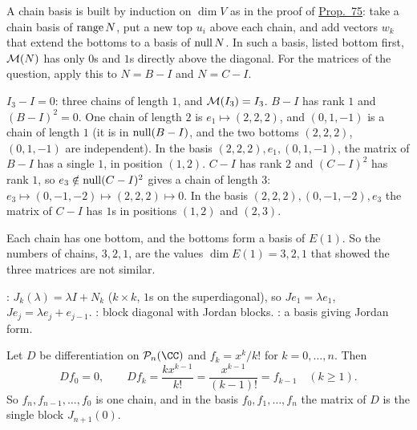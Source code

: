 \documentclass[10pt]{scrartcl}
\begin{document}
\revisit A chain basis is built by induction on $\dim V$ as in the proof of \hyperref[prop-75]{Prop.~75}: take a chain basis of $\operatorname{range} N$, put a new top $u_i$ above each chain, and add vectors $w_k$ that extend the bottoms to a basis of $\operatorname{null} N$. In such a basis, listed bottom first, $\mathcal M(N)$ has only $0$s and $1$s directly above the diagonal. For the matrices of the question, apply this to $N=B-I$ and $N=C-I$.
\begin{itemize}
  \ii $I_3-I=0$: three chains of length $1$, and $\mathcal M(I_3)=I_3$.
  \ii $B-I$ has rank $1$ and $(B-I)^2=0$. One chain of length $2$ is $e_1\mapsto(2,2,2)$, and $(0,1,-1)$ is a chain of length $1$ (it is in $\operatorname{null}(B-I)$, and the two bottoms $(2,2,2)$, $(0,1,-1)$ are independent). In the basis $(2,2,2),e_1,(0,1,-1)$, the matrix of $B-I$ has a single $1$, in position $(1,2)$.
  \ii $C-I$ has rank $2$ and $(C-I)^2$ has rank $1$, so $e_3\notin\operatorname{null}(C-I)^2$ gives a chain of length $3$: $e_3\mapsto(0,-1,-2)\mapsto(2,2,2)\mapsto0$. In the basis $(2,2,2),(0,-1,-2),e_3$ the matrix of $C-I$ has $1$s in positions $(1,2)$ and $(2,3)$.
\end{itemize}
Each chain has one bottom, and the bottoms form a basis of $E(1)$. So the numbers of chains, $3,2,1$, are the values $\dim E(1)=3,2,1$ that showed the three matrices are not similar.

\begin{definition*}[Def.~40]\hypertarget{def-40}{}\label{def-40}
  : $J_k(\lambda)=\lambda I+N_k$ ($k\times k$, $1$s on the superdiagonal), so $Je_1=\lambda e_1$, $Je_j=\lambda e_j+e_{j-1}$. : block diagonal with Jordan blocks. : a basis giving Jordan form.
\end{definition*}

\begin{example*}
  Let $D$ be differentiation on $\PP_n(\CC)$ and $f_k=x^k/k!$ for $k=0,\dots,n$. Then
  \[ Df_0=0,\qquad Df_k=\frac{kx^{k-1}}{k!}=\frac{x^{k-1}}{(k-1)!}=f_{k-1}\quad(k\ge1). \]
  So $f_n,f_{n-1},\dots,f_0$ is one chain, and in the basis $f_0,f_1,\dots,f_n$ the matrix of $D$ is the single block $J_{n+1}(0)$.
\end{example*}
\end{document}
